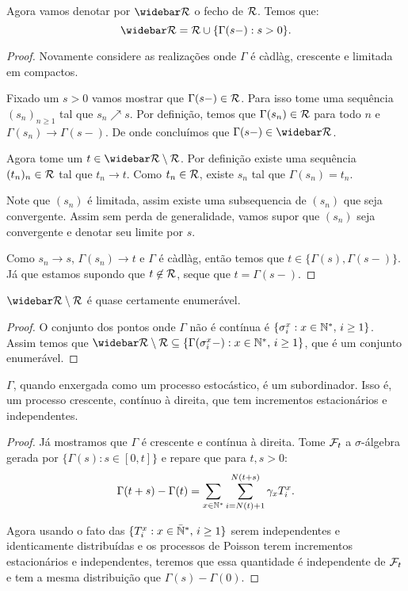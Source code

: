 \begin{proposicao}
  Agora vamos denotar por $\RRb$ o fecho de ${\mathcal{R}}$. Temos que:
  \begin{displaymath}
    \RRb = \RR \cup \{ \Gamma(s-) : s > 0 \}.
  \end{displaymath}
\end{proposicao}
\begin{proof}
  Novamente considere as realizações onde $\Gamma$ é càdlàg, crescente
  e limitada em compactos.

  Fixado um $s > 0$ vamos mostrar que $\Gamma(s-) \in {\mathcal{R}}$. Para isso
  tome uma sequência $(s_n)_{n \geq 1}$ tal que $s_n \nearrow s$. Por
  definição, temos que $\Gamma(s_n) \in {\mathcal{R}}$ para todo $n$ e
  $\Gamma(s_n) \to \Gamma(s-)$. De onde concluímos que $\Gamma(s-) \in
  \RRb$.

  Agora tome um $t \in \RRb \setminus \RR$. Por definição existe uma
  sequência $(t_n)_n \in {\mathcal{R}}$ tal que $t_n \to t$. Como $t_n \in {\mathcal{R}}$,
  existe $s_n$ tal que $\Gamma(s_n) = t_n$.

  Note que $(s_n)$ é limitada, assim existe uma subsequencia de $(s_n)$
  que seja convergente. Assim sem perda de generalidade, vamos supor
  que $(s_n)$ seja convergente e denotar seu limite por $s$.

  Como $s_n \to s$, $\Gamma(s_n) \to t$ e $\Gamma$ é càdlàg, então
  temos que $t \in \{ \Gamma(s), \Gamma(s-) \}$. Já que estamos
  supondo que $t \not\in {\mathcal{R}}$, seque que $t = \Gamma(s-)$.
\end{proof}

\begin{proposicao}
  $\RRb \setminus \RR$ é quase certamente enumerável.
\end{proposicao}
\begin{proof}
  O conjunto dos pontos onde $\Gamma$ não é contínua é $\{ \sigma_i^x:
  x \in {\mathbb{N^*}}, \, i \geq 1\}$. Assim temos que $\RRb \setminus \RR
  \subseteq \{ \Gamma(\sigma_i^x-): x \in \Nz, \, i \geq 1\}$, que é
  um conjunto enumerável.
\end{proof}

\begin{proposicao}
  $\Gamma$, quando enxergada como um processo estocástico, é um
  subordinador. Isso é, um processo crescente, contínuo à direita, que
  tem incrementos estacionários e independentes.
\end{proposicao}
\begin{proof}

  Já mostramos que $\Gamma$ é crescente e contínua à direita.  Tome
  ${\mathcal{F}}_t$ a $\sigma$-álgebra gerada por $\{ \Gamma(s): s \in [0,
  t]\}$ e repare que para $t, s > 0$:
  \begin{displaymath}
    \Gamma(t+s) - \Gamma(t) = \sum_{x \in {\mathbb{N^*}}} \sum_{i =
      N(t)+1}^{N(t+s)} \gamma_x T_i^x.
  \end{displaymath}

  Agora usando o fato das $\{ T_i^x: x \in {\mathbb{\bar{N}^*}}, \, i \geq 1\}$ serem
  independentes e identicamente distribuídas e os processos de Poisson
  terem incrementos estacionários e independentes, teremos que essa
  quantidade é independente de ${\mathcal{F}}_t$ e tem a mesma distribuição que
  $\Gamma(s) - \Gamma(0)$.
\end{proof}

